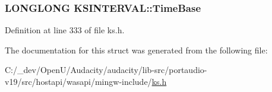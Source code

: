 \subsubsection[{\texorpdfstring{Time\+Base}{TimeBase}}]{\setlength{\rightskip}{0pt plus 5cm}L\+O\+N\+G\+L\+O\+NG K\+S\+I\+N\+T\+E\+R\+V\+A\+L\+::\+Time\+Base}\hypertarget{struct_k_s_i_n_t_e_r_v_a_l_a890f5ef2967056afb2a30db80b87e4e2}{}\label{struct_k_s_i_n_t_e_r_v_a_l_a890f5ef2967056afb2a30db80b87e4e2}


Definition at line 333 of file ks.\+h.



The documentation for this struct was generated from the following file\+:\begin{DoxyCompactItemize}
\item 
C\+:/\+\_\+dev/\+Open\+U/\+Audacity/audacity/lib-\/src/portaudio-\/v19/src/hostapi/wasapi/mingw-\/include/\hyperlink{ks_8h}{ks.\+h}\end{DoxyCompactItemize}
